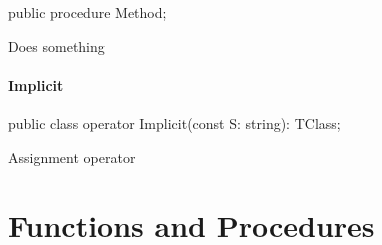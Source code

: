 \documentclass{report}
\newif\ifpdf
\begin{document}
\label{ok_parse_impl.TClass-Method}
\begin{list}{}{
\setlength{\itemindent}{0cm}
\setlength{\listparindent}{0cm}
\setlength{\leftmargin}{\evensidemargin}
\addtolength{\leftmargin}{\tmplength}
\settowidth{\labelsep}{X}
\addtolength{\leftmargin}{\labelsep}
\setlength{\labelwidth}{\tmplength}
}
\item[\textbf{Declaration}\hfill]
\ifpdf
\begin{flushleft}
\fi
\begin{ttfamily}
public procedure Method;\end{ttfamily}

\ifpdf
\end{flushleft}
\fi

\par
\item[\textbf{Description}]
Does something

\end{list}
\paragraph*{Implicit}\hspace*{\fill}

\label{ok_parse_impl.TClass-Implicit}
\begin{list}{}{
\setlength{\itemindent}{0cm}
\setlength{\listparindent}{0cm}
\setlength{\leftmargin}{\evensidemargin}
\addtolength{\leftmargin}{\tmplength}
\settowidth{\labelsep}{X}
\addtolength{\leftmargin}{\labelsep}
\setlength{\labelwidth}{\tmplength}
}
\item[\textbf{Declaration}\hfill]
\ifpdf
\begin{flushleft}
\fi
\begin{ttfamily}
public class operator Implicit(const S: string): TClass;\end{ttfamily}

\ifpdf
\end{flushleft}
\fi

\par
\item[\textbf{Description}]
Assignment operator

\end{list}
\section{Functions and Procedures}
\ifpdf
\end{document}
